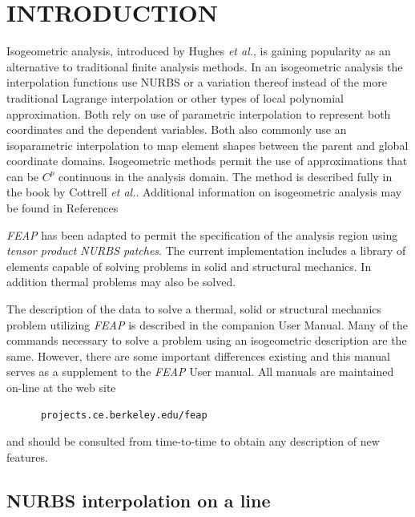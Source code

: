 \chapter[Introduction]{INTRODUCTION}
\label{intro}

Isogeometric analysis, introduced by Hughes \textit{et al.},
is gaining popularity as an alternative to traditional finite analysis
methods.  In an isogeometric analysis the interpolation
functions use NURBS or a variation thereof instead of
the more traditional Lagrange interpolation or other types of local polynomial
approximation.
Both rely on use of parametric interpolation to represent both
coordinates and the dependent variables.  Both also commonly use an
isoparametric interpolation to map element shapes between the parent
and global coordinate domains.
Isogeometric methods permit the use of approximations that can be $C^p$
continuous in the analysis domain.
The method is described fully in the book by Cottrell
\textit{et al.}.
Additional information on isogeometric analysis may be found in
References \cite{bazilevs06a,cottrell06a,bazilevs06b,cottrell07a,zhang07a,
bazilevs08a,elguedj08a,gomez08a,hughes08a,wall08a,
evans09a,lu09a,kiendl09a,kiendl10a,bazilevs10a,echter10a,
benson10a,benson10b,benson11b,taylor11a}

\textsl{FEAP} has been adapted to permit the specification of the
analysis region using \textit{tensor product NURBS patches}.
The current implementation includes a library of elements capable of
solving problems in solid and structural mechanics.  In addition
thermal problems may also be solved. 

The description of the data to solve a thermal, solid or structural
mechanics problem utilizing \textsl{FEAP} is described in the
companion User Manual.
Many of the commands necessary to solve a problem using an
isogeometric description are the same.  However, there are some
important differences existing and 
this manual serves as a supplement to the \textsl{FEAP} User
manual.  All manuals are maintained  on-line at the web site
\begin{verbatim}
      projects.ce.berkeley.edu/feap
\end{verbatim}
and should be consulted from time-to-time to obtain any description of
new features.

\section{NURBS interpolation on a line}

